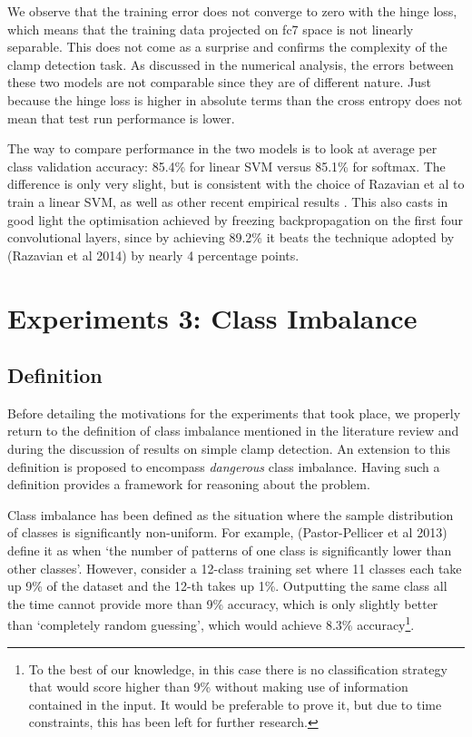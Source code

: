 \documentclass[a4paper,11pt]{article}
\begin{document}
We observe that the training error does not converge to zero with the hinge loss, which means that the training data projected on fc7 space is not linearly separable. This does not come as a surprise and confirms the complexity of the clamp detection task. As discussed in the numerical analysis, the errors between these two models are not comparable since they are of different nature. Just because the hinge loss is higher in absolute terms than the cross entropy does not mean that test run performance is lower. 

The way to compare performance in the two models is to look at average per class validation accuracy: 85.4\% for linear SVM versus 85.1\% for softmax. The difference is only very slight, but is consistent with the choice of Razavian et al to train a linear SVM, as well as other recent empirical results \cite{svm-nn}. This also casts in good light the optimisation achieved by freezing backpropagation on the first four convolutional layers, since by achieving 89.2\% it beats the technique adopted by (Razavian et al 2014) by nearly 4 percentage points.


\clearpage
\section{Experiments 3: Class Imbalance}

\subsection{Definition}

Before detailing the motivations for the experiments that took place, we properly return to the definition of class imbalance mentioned in the literature review and during the discussion of results on simple clamp detection. An extension to this definition is proposed to encompass \textit{dangerous} class imbalance. Having such a definition provides a framework for reasoning about the problem.

Class imbalance has been defined as the situation where the sample distribution of classes is significantly non-uniform. For example, (Pastor-Pellicer et al 2013) \cite{f-measure} define it as when `the number of patterns of one class is significantly lower than other classes'. However, consider a 12-class training set where 11 classes each take up 9\% of the dataset and the 12-th takes up 1\%. Outputting the same class all the time cannot provide more than 9\% accuracy, which is only slightly better than `completely random guessing', which would achieve 8.3\% accuracy\footnote{To the best of our knowledge, in this case there is no classification strategy that would score higher than 9\% without making use of information contained in the input. It would be preferable to prove it, but due to time constraints, this has been left for further research.}. \\
\end{document}

